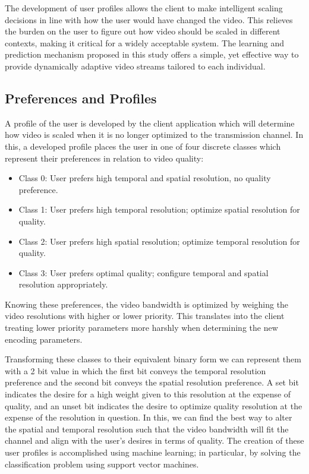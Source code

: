 The development of user profiles allows the client to make intelligent scaling decisions in line with how the user would have changed the video. This relieves the burden on the user to figure out how video should be scaled in different contexts, making it critical for a widely acceptable system. The learning and prediction mechanism proposed in this study offers a simple, yet effective way to provide dynamically adaptive video streams tailored to each individual.

\subsection{Preferences and Profiles}
A profile of the user is developed by the client application which will determine how video is scaled when it is no longer optimized to the transmission channel. In this, a developed profile places the user in one of four discrete classes which represent their preferences in relation to video quality:
\begin{itemize}
\item Class 0: User prefers high temporal and spatial resolution, no quality preference.
\item Class 1: User prefers high temporal resolution; optimize spatial resolution for quality.
\item Class 2: User prefers high spatial resolution; optimize temporal resolution for quality.
\item Class 3: User prefers optimal quality; configure temporal and spatial resolution appropriately.
\end{itemize}
Knowing these preferences, the video bandwidth is optimized by weighing the video resolutions with higher or lower priority. This translates into the client treating lower priority parameters more harshly when determining the new encoding parameters.

Transforming these classes to their equivalent binary form we can represent them with a 2 bit value in which the first bit conveys the temporal resolution preference and the second bit conveys the spatial resolution preference. A set bit indicates the desire for a high weight given to this resolution at the expense of quality, and an unset bit indicates the desire to optimize quality resolution at the expense of the resolution in question. In this, we can find the best way to alter the spatial and temporal resolution such that the video bandwidth will fit the channel and align with the user's desires in terms of quality. The creation of these user profiles is accomplished using machine learning; in particular, by solving the classification problem using support vector machines.

